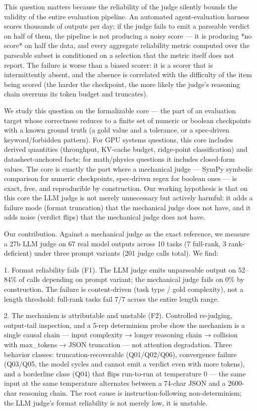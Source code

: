 \documentclass[10pt,twocolumn]{article}
\begin{document}
This question matters because the reliability of the judge silently bounds the validity of the entire evaluation pipeline. An automated agent-evaluation harness scores thousands of outputs per day; if the judge fails to emit a parseable verdict on half of them, the pipeline is not producing a noisy score — it is producing *no score* on half the data, and every aggregate reliability metric computed over the parseable subset is conditioned on a selection that the metric itself does not report. The failure is worse than a biased scorer: it is a scorer that is intermittently absent, and the absence is correlated with the difficulty of the item being scored (the harder the checkpoint, the more likely the judge's reasoning chain overruns its token budget and truncates).


We study this question on the formalizable core — the part of an evaluation target whose correctness reduces to a finite set of numeric or boolean checkpoints with a known ground truth (a gold value and a tolerance, or a spec-driven keyword/forbidden pattern). For GPU systems questions, this core includes derived quantities (throughput, KV-cache budget, ridge-point classification) and datasheet-anchored facts; for math/physics questions it includes closed-form values. The core is exactly the part where a mechanical judge — SymPy symbolic comparison for numeric checkpoints, spec-driven regex for boolean ones — is exact, free, and reproducible by construction. Our working hypothesis is that on this core the LLM judge is not merely unnecessary but actively harmful: it adds a failure mode (format truncation) that the mechanical judge does not have, and it adds noise (verdict flips) that the mechanical judge does not have.


Our contribution. Against a mechanical judge as the exact reference, we measure a 27b LLM judge on 67 real model outputs across 10 tasks (7 full-rank, 3 rank-deficient) under three prompt variants (201 judge calls total). We find:


1. Format reliability fails (F1). The LLM judge emits unparseable output on 52–84\% of calls depending on prompt variant; the mechanical judge fails on 0\% by construction. The failure is content-driven (task type / gold complexity), not a length threshold: full-rank tasks fail 7/7 across the entire length range.


2. The mechanism is attributable and unstable (F2). Controlled re-judging, output-tail inspection, and a 5-rep determinism probe show the mechanism is a single causal chain — input complexity → longer reasoning chain → collision with max\_tokens → JSON truncation — not attention degradation. Three behavior classes: truncation-recoverable (Q01/Q02/Q06), convergence failure (Q03/Q05, the model cycles and cannot emit a verdict even with more tokens), and a borderline class (Q04) that flips run-to-run at temperature 0 — the same input at the same temperature alternates between a 74-char JSON and a 2600-char reasoning chain. The root cause is instruction-following non-determinism; the LLM judge's format reliability is not merely low, it is unstable.
\end{document}
